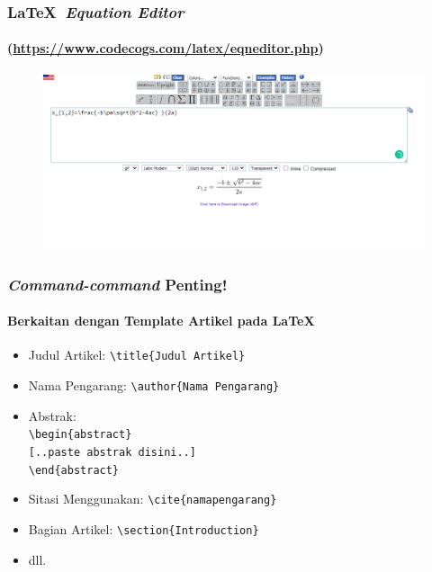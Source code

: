 \documentclass[aspectratio=169]{beamer}
\begin{document}
\begin{frame}
\frametitle{\LaTeX\ \textit{Equation Editor}}
\framesubtitle{(\url{https://www.codecogs.com/latex/eqneditor.php})}
\begin{figure}
    \centering
    \includegraphics[width=\textwidth]{gambar/codecogs.png}
\end{figure}
\end{frame}

\begin{frame}[fragile]
\frametitle{\textit{Command-command} Penting!}
\framesubtitle{Berkaitan dengan Template Artikel pada \LaTeX}
\begin{itemize}
    \item Judul Artikel: \verb|\title{Judul Artikel}|
    \item Nama Pengarang: \verb|\author{Nama Pengarang}|
    \item Abstrak: \\
    \verb|\begin{abstract}|\\
        \verb|[..paste abstrak disini..]|\\
    \verb|\end{abstract}|
    \item Sitasi Menggunakan: \verb|\cite{namapengarang}|
    \item Bagian Artikel: \verb|\section{Introduction}|
    \item dll.
\end{itemize}
\end{frame}
\end{document}
